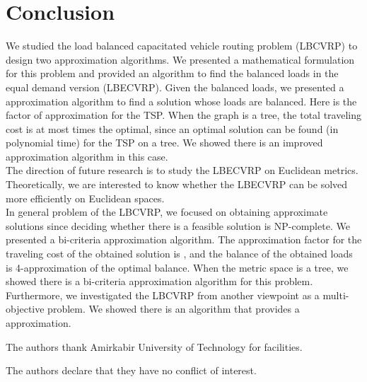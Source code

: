 \section{Conclusion}
\noindent We studied the load balanced capacitated vehicle routing problem (LBCVRP)  to design two approximation algorithms. We presented a mathematical formulation for this problem and provided an algorithm to find the balanced loads in the equal demand version (LBECVRP). Given the balanced loads, we presented a  approximation algorithm to find a solution whose loads are balanced. Here  is the factor of approximation for the TSP. When the graph is a tree, the total traveling cost is at most  times the optimal, since an optimal solution can be found (in polynomial time) for the TSP on a tree. We showed there is an improved approximation algorithm in this case. \\
\indent The direction of future research is to study the LBECVRP on Euclidean metrics. Theoretically, we are interested to know whether the LBECVRP can be solved more efficiently on Euclidean spaces. \\
\indent In general problem of the LBCVRP, we focused on obtaining approximate solutions since deciding whether there is a feasible solution is NP-complete. We presented a  bi-criteria approximation algorithm. The approximation factor for the traveling cost of the obtained solution is , and the balance of the obtained loads is 4-approximation of the optimal balance. When the metric space is a tree, we showed there is a  bi-criteria approximation algorithm for this problem.\\
\indent Furthermore, we investigated the LBCVRP from another viewpoint as a multi-objective problem. We showed there is an algorithm that provides a approximation.
\begin{acknowledgements}
The authors thank Amirkabir University of Technology for facilities.
\end{acknowledgements}
 The authors declare that they have no conflict of interest.

